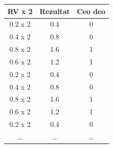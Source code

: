 \begin{tabular}{ccc}\toprule
RV x 2 & Rezultat & Ceo deo\\\midrule
0.2 x 2&0.4&0\\0.4 x 2&0.8&0\\0.8 x 2&1.6&1\\0.6 x 2&1.2&1\\
0.2 x 2&0.4&0\\0.4 x 2&0.8&0\\0.8 x 2&1.6&1\\0.6 x 2&1.2&1\\0.2 x 2&0.4&0\\
\ldots&\ldots&\ldots\\\bottomrule
\end{tabular}